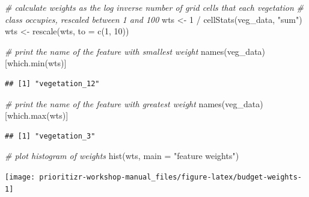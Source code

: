 \documentclass[
  12pt,
]{book}
\newenvironment{Shaded}{\begin{snugshade}}{\end{snugshade}}
\newcommand{\AttributeTok}[1]{\textcolor[rgb]{0.77,0.63,0.00}{#1}}
\newcommand{\CommentTok}[1]{\textcolor[rgb]{0.56,0.35,0.01}{\textit{#1}}}
\newcommand{\DecValTok}[1]{\textcolor[rgb]{0.00,0.00,0.81}{#1}}
\newcommand{\FunctionTok}[1]{\textcolor[rgb]{0.00,0.00,0.00}{#1}}
\newcommand{\NormalTok}[1]{#1}
\newcommand{\OtherTok}[1]{\textcolor[rgb]{0.56,0.35,0.01}{#1}}
\newcommand{\SpecialCharTok}[1]{\textcolor[rgb]{0.00,0.00,0.00}{#1}}
\newcommand{\StringTok}[1]{\textcolor[rgb]{0.31,0.60,0.02}{#1}}
\begin{document}
\begin{Shaded}
\begin{Highlighting}[]
\CommentTok{\# calculate weights as the log inverse number of grid cells that each vegetation}
\CommentTok{\# class occupies, rescaled between 1 and 100}
\NormalTok{wts }\OtherTok{\textless{}{-}} \DecValTok{1} \SpecialCharTok{/} \FunctionTok{cellStats}\NormalTok{(veg\_data, }\StringTok{"sum"}\NormalTok{)}
\NormalTok{wts }\OtherTok{\textless{}{-}} \FunctionTok{rescale}\NormalTok{(wts, }\AttributeTok{to =} \FunctionTok{c}\NormalTok{(}\DecValTok{1}\NormalTok{, }\DecValTok{10}\NormalTok{))}

\CommentTok{\# print the name of the feature with smallest weight}
\FunctionTok{names}\NormalTok{(veg\_data)[}\FunctionTok{which.min}\NormalTok{(wts)]}
\end{Highlighting}
\end{Shaded}

\begin{verbatim}
## [1] "vegetation_12"
\end{verbatim}

\begin{Shaded}
\begin{Highlighting}[]
\CommentTok{\# print the name of the feature with greatest weight}
\FunctionTok{names}\NormalTok{(veg\_data)[}\FunctionTok{which.max}\NormalTok{(wts)]}
\end{Highlighting}
\end{Shaded}

\begin{verbatim}
## [1] "vegetation_3"
\end{verbatim}

\begin{Shaded}
\begin{Highlighting}[]
\CommentTok{\# plot histogram of weights}
\FunctionTok{hist}\NormalTok{(wts, }\AttributeTok{main =} \StringTok{"feature weights"}\NormalTok{)}
\end{Highlighting}
\end{Shaded}

\begin{center}\texttt{[image: prioritizr-workshop-manual\_files/figure-latex/budget-weights-1]} \end{center}
\end{document}
